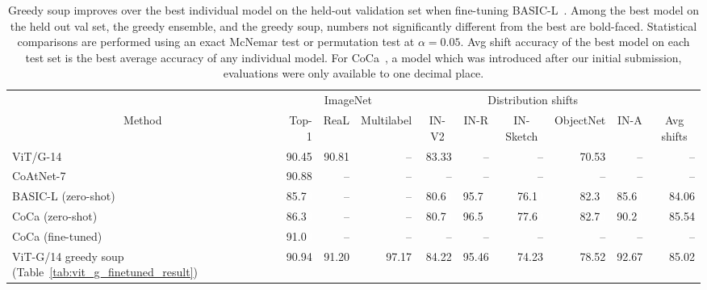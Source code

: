 \documentclass[nohyperref]{article}
\theoremstyle{plain}
\theoremstyle{definition}
\theoremstyle{remark}
\begin{document}
            \begin{table}[h]
            \caption{Greedy soup improves over the best individual model on the held-out validation set when fine-tuning BASIC-L~\cite{pham2021scaling}. Among the best model on the held out val set, the greedy ensemble, and the greedy soup, numbers not significantly different from the best are bold-faced. Statistical comparisons are performed using an exact McNemar test or permutation test at $\alpha = 0.05$. Avg shift accuracy of the best model on each test set is the best average accuracy of any individual model. For CoCa~\cite{yu2022coca}, a model which was introduced after our initial submission, evaluations were only available to one decimal place.}
            \label{tab:basic_finetuned_result}
            \centering
            \footnotesize
            \setlength{\tabcolsep}{0.4em}
            \begin{tabular}{ l | r r r | r r r r r | r}
                \toprule
                & \multicolumn{3}{c|}{ImageNet} & \multicolumn{5}{c|}{Distribution shifts} & \\\cmidrule(l{2pt}r{2pt}){2-4}\cmidrule(l{2pt}r{2pt}){5-9}
                \multicolumn{1}{c|}{Method} & Top-1 & ReaL & Multilabel  & \multicolumn{1}{c}{IN-V2} & \multicolumn{1}{c}{IN-R} & \multicolumn{1}{c}{IN-Sketch} & \multicolumn{1}{c}{ObjectNet} & \multicolumn{1}{c|}{IN-A} & \multicolumn{1}{c}{Avg shifts}\\
                \midrule
                ViT/G-14~\cite{zhai2021scaling} & 90.45 & 90.81 & -- & 83.33 & -- & -- & 70.53 & -- & -- \\
                CoAtNet-7~\cite{dai2021coatnet} & 90.88 & -- & -- & -- & -- & -- & -- & -- & -- \\
                BASIC-L (zero-shot)~\cite{pham2021scaling} & 85.7\textcolor{white}{0}  & -- & -- & 80.6\textcolor{white}{0} & 95.7\textcolor{white}{0} & 76.1\textcolor{white}{0} & 82.3\textcolor{white}{0} & 85.6\textcolor{white}{0} & 84.06 \\
                CoCa (zero-shot)~\cite{yu2022coca} & 86.3\textcolor{white}{0} & -- & -- & 80.7\textcolor{white}{0} & 96.5\textcolor{white}{0} & 77.6\textcolor{white}{0} & 82.7\textcolor{white}{0} & 90.2\textcolor{white}{0} & 85.54 \\
                CoCa (fine-tuned)~\cite{yu2022coca} & 91.0\textcolor{white}{0} & -- & -- & -- & -- & -- & -- & -- & -- \\
                ViT-G/14 greedy soup (Table~\ref{tab:vit_g_finetuned_result}) & 90.94 & 91.20 & 97.17 & 84.22 & 95.46 & 74.23 & 78.52 & 92.67 & 85.02 \\

\end{tabular}
\end{table}
\end{document}
